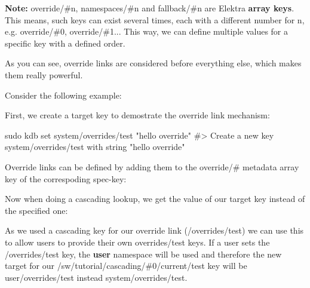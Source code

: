 {\bfseries Note\+:} {\ttfamily override/\#n}, {\ttfamily namespaces/\#n} and {\ttfamily fallback/\#n} are Elektra {\bfseries array keys}. This means, such keys can exist several times, each with a different number for {\ttfamily n}, e.\+g. {\ttfamily override/\#0}, {\ttfamily override/\#1}... This way, we can define multiple values for a specific key with a defined order.

As you can see, override links are considered before everything else, which makes them really powerful.

Consider the following example\+:

First, we create a target key to demostrate the override link mechanism\+:


\begin{DoxyCode}
sudo kdb set system/overrides/test "hello override"
#> Create a new key system/overrides/test with string "hello override"
\end{DoxyCode}


Override links can be defined by adding them to the {\ttfamily override/\#} metadata array key of the correspoding {\ttfamily spec-\/key}\+:




Now when doing a cascading lookup, we get the value of our target key instead of the specified one\+:




As we used a cascading key for our override link ({\ttfamily /overrides/test}) we can use this to allow users to provide their own {\ttfamily overrides/test} keys. If a user sets the {\ttfamily /overrides/test} key, the {\bfseries user} namespace will be used and therefore the new target for our {\ttfamily /sw/tutorial/cascading/\#0/current/test} key will be {\ttfamily user/overrides/test} instead {\ttfamily system/overrides/test}.




